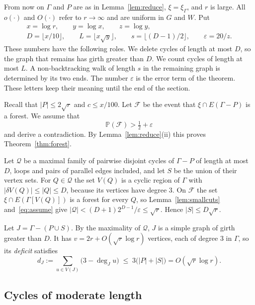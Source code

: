 \documentclass[11pt]{article}
\theoremstyle{definition}
\theoremstyle{remark}
\newcommand{\PP}{\mathbb{P}}
\numberwithin{equation}{section}
\begin{document}
From now on $\Gamma$ and $P$ are as in Lemma~\ref{lem:reduce}, $\xi=\xi_\Gamma$, and $r$ is large.
All $o(\cdot)$ and $O(\cdot)$ refer to $r\to\infty$ and are uniform in $G$ and $W$. Put
\begin{gather*}
  x=\log r,\qquad y=\log x,\qquad z=\log y,\\
  D=\lfloor x/10\rfloor,\qquad L=\lfloor x\sqrt y\rfloor,\qquad
  s=\lfloor(D-1)/2\rfloor,\qquad\varepsilon=20/z .
\end{gather*}
These numbers have the following roles. We delete cycles of length at most $D$, so the graph that
remains has girth greater than $D$. We count cycles of length at most $L$. A non-backtracking walk
of length $s$ in the remaining graph is determined by its two ends. The number $\varepsilon$ is the
error term of the theorem. These letters keep their meaning until the end of the section.

Recall that $|P|\le2\sqrt r$ and $c\le x/100$. Let $\mathcal{F}$ be the event that
$\xi\cap E(\Gamma-P)$ is a forest. We assume that
\begin{equation}\label{eq:assume}
  \PP(\mathcal{F})>\tfrac12+\varepsilon
\end{equation}
and derive a contradiction. By Lemma~\ref{lem:reduce}(ii) this proves Theorem~\ref{thm:forest}.

Let $\mathcal{Q}$ be a maximal family of pairwise disjoint cycles of $\Gamma-P$ of length at most $D$,
loops and pairs of parallel edges included, and let $S$ be the union of their vertex sets. For
$Q\in\mathcal{Q}$ the set $V(Q)$ is a cyclic region of $\Gamma$ with $|\delta V(Q)|\le|Q|\le D$,
because its vertices have degree $3$. On $\mathcal{F}$ the set $\xi\cap E(\Gamma[V(Q)])$ is a forest
for every $Q$, so Lemma~\ref{lem:smallcuts} and~\eqref{eq:assume} give
$|\mathcal{Q}|<(D+1)2^{D-1}/\varepsilon\le\sqrt r$. Hence $|S|\le D\sqrt r$.

Let $J=\Gamma-(P\cup S)$. By the maximality of $\mathcal{Q}$, $J$ is a simple graph of girth greater
than $D$. It has $v=2r+O(\sqrt r\log r)$ vertices, each of degree $3$ in $\Gamma$, so its
\emph{deficit} satisfies
\begin{equation}\label{eq:deficit}
  d_J:=\sum_{u\in V(J)}\bigl(3-\deg_Ju\bigr)\;\le\;3\bigl(|P|+|S|\bigr)=O(\sqrt r\log r).
\end{equation}

\subsection{Cycles of moderate length}
\end{document}
